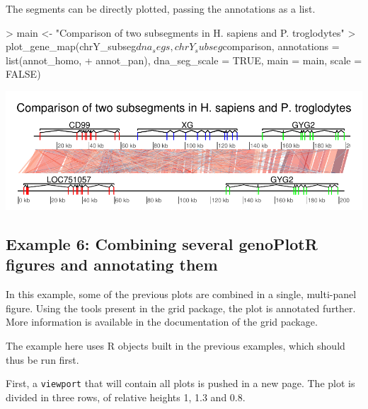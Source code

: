 \documentclass[a4paper]{article}
\newcommand{\code}[1]{\texttt{#1}}
\newcommand{\pkg}[1]{{\normalfont\fontseries{b}\selectfont #1}}
\newcommand{\genoPlotR}{\pkg{genoPlotR}}
\newcommand{\R}{{\sffamily R}}
\begin{document}
The segments can be directly plotted, passing the annotations as a list.

\begin{Schunk}
\begin{Sinput}
> main <- "Comparison of two subsegments in H. sapiens and P. troglodytes"
> plot_gene_map(chrY_subseg$dna_segs, chrY_subseg$comparison, annotations = list(annot_homo, 
+     annot_pan), dna_seg_scale = TRUE, main = main, scale = FALSE)
\end{Sinput}
\end{Schunk}
\begin{center}
\includegraphics{genoPlotR-037}
\end{center}

\subsection{Example 6: Combining several \genoPlotR{} figures and annotating them}

In this example, some of the previous plots are combined in a single, 
multi-panel figure. Using the tools present in the \pkg{grid} package, the
plot is annotated further. More information is available in the documentation
of the \pkg{grid} package.

The example here uses \R{} objects built in the previous examples, which 
should thus be run first.

First, a \code{viewport} that will contain all plots is pushed in a new page.
The plot is divided in three rows, of relative heights 1, 1.3 and 0.8.
\end{document}
